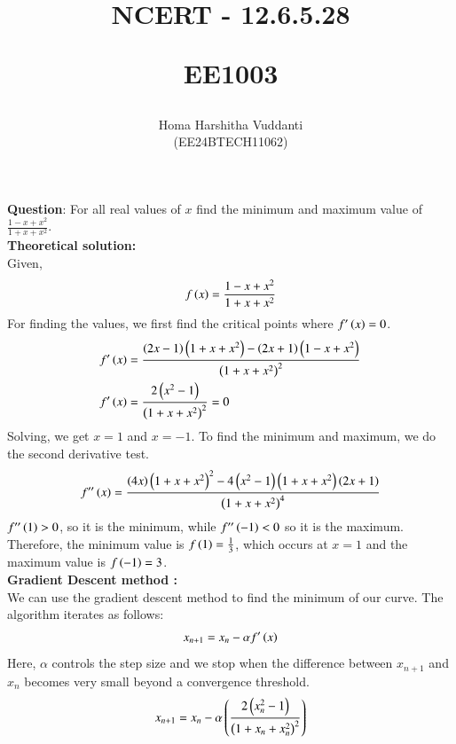 \documentclass[journal]{IEEEtran}
\begin{document}


\title{
NCERT - 12.6.5.28

\large{EE1003}
}
\author{Homa Harshitha Vuddanti

(EE24BTECH11062)
}	

\maketitle

\bigskip

\renewcommand{\thefigure}{\theenumi}
\renewcommand{\thetable}{\theenumi}
\textbf{Question}: For all real values of $x$ find the minimum and maximum value of $\frac{1-x+x^2}{1+x+x^2}$.\\
\textbf{Theoretical solution: }\\
Given,
\begin{align}
f\left(x\right)=\frac{1-x+x^2}{1+x+x^2}
\end{align}
For finding the values, we first find the critical points where $f^\prime\left(x\right)=0$. 
\begin{align}
f^\prime\left(x\right)&=
\frac{\left(2x-1\right)\left(1+x+x^2\right)-\left(2x+1\right)\left(1-x+x^2\right)}{\left(1+x+x^2\right)^2}\\
f^\prime\left(x\right)&=\frac{2\left(x^2-1\right)}{\left(1+x+x^2\right)^2}=0
\end{align}
Solving, we get $x=1$ and $x=-1$. To find the minimum and maximum, we do the second derivative test.
\begin{align}
f^{\prime\prime}\left(x\right)=\frac{\left(4x\right)\left(1+x+x^2\right)^2-4\left(x^2-1\right)\left(1+x+x^2\right)\left(2x+1\right)}{\left(1+x+x^2\right)^4}\\
\end{align}
$f^{\prime\prime}\left(1\right)>0$, so it is the minimum, while $f^{\prime\prime}\left(-1\right)<0$ so it is the maximum.
Therefore, the minimum value is $f\left(1\right)=\frac{1}{3}$, which occurs at $x=1$ and the maximum value is $f\left(-1\right)=3$.\\
\textbf{Gradient Descent method :}\\
We can use the gradient descent method to find the minimum of our curve. The algorithm iterates as follows:
\begin{align}
x_{n+1}=x_n-\alpha f^\prime\left(x\right)
\end{align}
Here, $\alpha$ controls the step size and we stop when the difference between $x_{n+1}$ and $x_n$ becomes very small beyond a convergence threshold.
\begin{align}
x_{n+1}=x_n-\alpha\left(\frac{2\left(x_n^2-1\right)}{\left(1+x_n+x_n^2\right)^2}\right)
\end{align}
\end{document}
